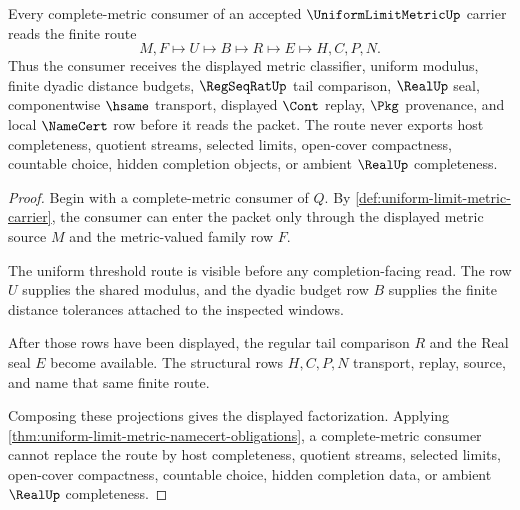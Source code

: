 \begin{theorem}
\label{thm:uniform-limit-metric-complete-handoff}
Every complete-metric consumer of an accepted $\UniformLimitMetricUp$ carrier reads the finite route
$$
M,F \longmapsto U \longmapsto B \longmapsto R \longmapsto E \longmapsto H,C,P,N .
$$
Thus the consumer receives the displayed metric classifier, uniform modulus, finite dyadic distance budgets, $\RegSeqRatUp$ tail comparison, $\RealUp$ seal, componentwise $\hsame$ transport, displayed $\Cont$ replay, $\Pkg$ provenance, and local $\NameCert$ row before it reads the packet. The route never exports host completeness, quotient streams, selected limits, open-cover compactness, countable choice, hidden completion objects, or ambient $\RealUp$ completeness.
\end{theorem}
\begin{proof}
Begin with a complete-metric consumer of $Q$. By \autoref{def:uniform-limit-metric-carrier}, the consumer can enter the packet only through the displayed metric source $M$ and the metric-valued family row $F$.

The uniform threshold route is visible before any completion-facing read. The row $U$ supplies the shared modulus, and the dyadic budget row $B$ supplies the finite distance tolerances attached to the inspected windows.

After those rows have been displayed, the regular tail comparison $R$ and the Real seal $E$ become available. The structural rows $H,C,P,N$ transport, replay, source, and name that same finite route.

Composing these projections gives the displayed factorization. Applying \autoref{thm:uniform-limit-metric-namecert-obligations}, a complete-metric consumer cannot replace the route by host completeness, quotient streams, selected limits, open-cover compactness, countable choice, hidden completion data, or ambient $\RealUp$ completeness.
\end{proof}


